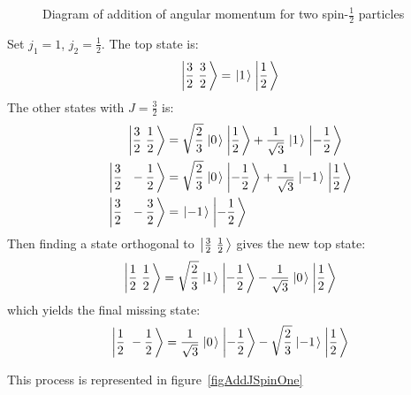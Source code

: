 \documentclass[../Main.tex]{subfiles}
\begin{document}
\begin{figure}
    \centering
    \caption{Diagram of addition of angular momentum for two spin-$\frac12$ particles}
    \label{figAddJSpinHalf}
\end{figure}
\begin{example}
    Set $j_1 = 1$, $j_2 = \frac12$. The top state is:
    \begin{equation*}
        \ket{\frac32~\frac32} = \ket1 \ket{\frac12}
    \end{equation*}
    The other states with $J = \frac32$ is:
    \begin{align*}
        \ket{\frac32~\frac12} &= \sqrt{\frac23} \ket0 \ket{\frac12} + \frac1{\sqrt{3}} \ket1 \ket{-\frac12} \\
        \ket{\frac32~~-\frac12} &= \sqrt{\frac23}\ket0\ket{-\frac12} + \frac1{\sqrt{3}} \ket{-1} \ket{\frac12} \\
        \ket{\frac32~~-\frac32} &= \ket{-1}\ket{-\frac12}
    \end{align*}
    Then finding a state orthogonal to $\ket{\frac32~\frac12}$ gives the new top state:
    \begin{equation*}
        \ket{\frac12~\frac12} = \sqrt{\frac23}\ket1 \ket{-\frac12} - \frac1{\sqrt{3}} \ket0 \ket{\frac12}
    \end{equation*}
    which yields the final missing state:
    \begin{equation*}
        \ket{\frac12~-\frac12} = \frac1{\sqrt{3}} \ket 0 \ket{-\frac12} - \sqrt{\frac23} \ket{-1} \ket{\frac12}
    \end{equation*}

    This process is represented in figure~\ref{figAddJSpinOne}
\end{example}
\end{document}
